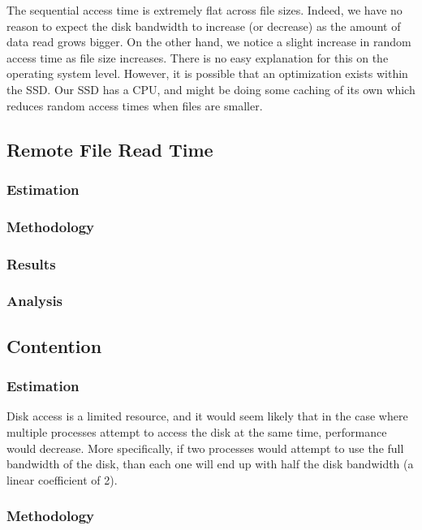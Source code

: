 The sequential access time is extremely flat across file sizes. Indeed, we have no reason to expect the disk bandwidth to increase (or decrease) as the amount of data read grows bigger. On the other hand, we notice a slight increase in random access time as file size increases. There is no easy explanation for this on the operating system level. However, it is possible that an optimization exists within the SSD. Our SSD has a CPU, and might be doing some caching of its own which reduces random access times when files are smaller.

\subsection{Remote File Read Time}

\subsubsection{Estimation}

\subsubsection{Methodology}

\subsubsection{Results}

\subsubsection{Analysis}

\subsection{Contention}

\subsubsection{Estimation}

Disk access is a limited resource, and it would seem likely that in the case where multiple processes attempt to access the disk at the same time, performance would decrease. More specifically, if two processes would attempt to use the full bandwidth of the disk, than each one will end up with half the disk bandwidth (a linear coefficient of 2).

\subsubsection{Methodology}

